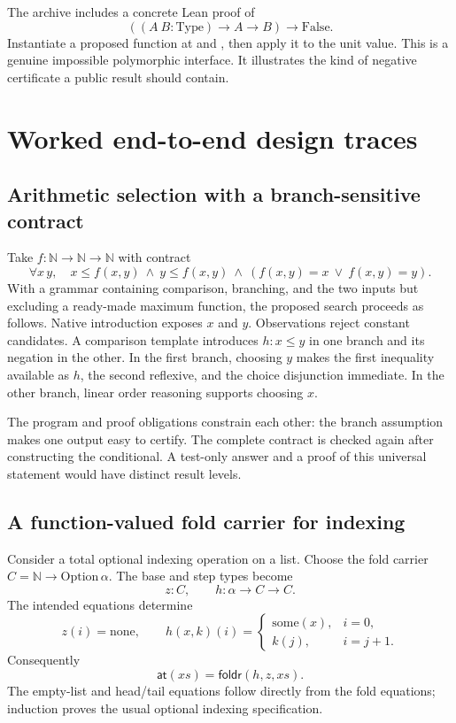 \documentclass[11pt,a4paper]{article}
\newcommand{\code}[1]{\texttt{\detokenize{#1}}}
\newcommand{\N}{\mathbb N}
\theoremstyle{remark}
\begin{document}
The archive includes a concrete Lean proof of
\[
 ((A\ B:\mathrm{Type})\to A\to B)\to\mathrm{False}.
\]
Instantiate a proposed function at \code{Unit} and \code{Empty}, then apply it to the unit value. This is a genuine impossible polymorphic interface. It illustrates the kind of negative certificate a public \code{Refuted} result should contain.

\section{Worked end-to-end design traces}\label{sec:traces}

\subsection{Arithmetic selection with a branch-sensitive contract}

Take $f:\N\to\N\to\N$ with contract
\[
 \forall x\,y,\quad x\le f(x,y)\ \land\ y\le f(x,y)
       \ \land\ (f(x,y)=x\ \lor\ f(x,y)=y).
\]
With a grammar containing comparison, branching, and the two inputs but excluding a ready-made maximum function, the proposed search proceeds as follows. Native introduction exposes $x$ and $y$. Observations reject constant candidates. A comparison template introduces $h:x\le y$ in one branch and its negation in the other. In the first branch, choosing $y$ makes the first inequality available as $h$, the second reflexive, and the choice disjunction immediate. In the other branch, linear order reasoning supports choosing $x$.

The program and proof obligations constrain each other: the branch assumption makes one output easy to certify. The complete contract is checked again after constructing the conditional. A test-only answer and a proof of this universal statement would have distinct result levels.

\subsection{A function-valued fold carrier for indexing}

Consider a total optional indexing operation on a list. Choose the fold carrier $C=\N\to\mathrm{Option}\,\alpha$. The base and step types become
\[
 z:C,\qquad h:\alpha\to C\to C.
\]
The intended equations determine
\[
 z(i)=\mathrm{none},\qquad
 h(x,k)(i)=
 \begin{cases}
 \mathrm{some}(x),&i=0,\\
 k(j),&i=j+1.
 \end{cases}
\]
Consequently
\[
 \mathsf{at}(xs)=\mathsf{foldr}(h,z,xs).
\]
The empty-list and head/tail equations follow directly from the fold equations; induction proves the usual optional indexing specification.
\end{document}
